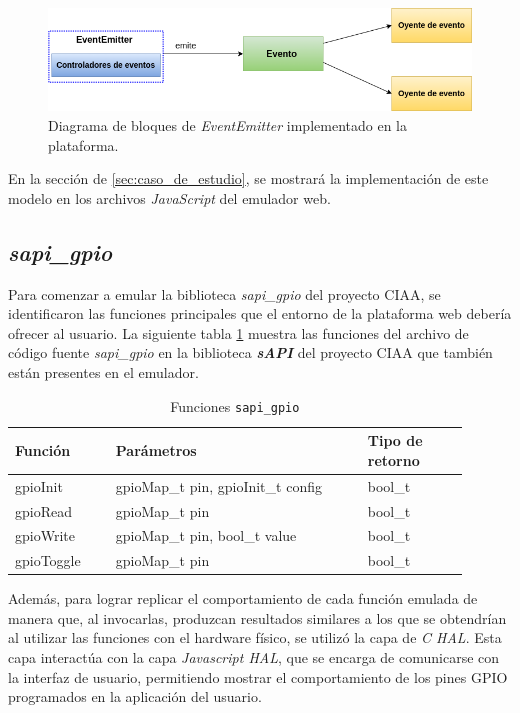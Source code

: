 \begin{figure}[ht]
	\centering
	\includegraphics[scale=.49]{./Figures/EventemitterNodejs.png}
	\caption{Diagrama de bloques de \textit{EventEmitter} implementado en la plataforma.}
	\label{fig:EventemitterNodejs}
\end{figure}

En la sección de \ref{sec:caso_de_estudio}, se mostrará la implementación de este modelo en los archivos \textit{JavaScript} del emulador web.

\subsection{\textit{\textbf{sapi\_gpio}}}

Para comenzar a emular la biblioteca \textit{sapi\_gpio} del proyecto CIAA, se identificaron las funciones principales que el entorno de la plataforma web debería ofrecer al usuario. La siguiente tabla \ref{tab:sapiGPIO} muestra las funciones del archivo de código fuente \textit{sapi\_gpio} en la biblioteca \textit{\textbf{sAPI}} del proyecto CIAA que también están presentes en el emulador.

\hfill \break

\begin{table}[h]
	\centering
	\caption[Funciones \texttt{sapi\_gpio}]{Funciones \texttt{sapi\_gpio}}
	\begin{tabular}{p{0.20\linewidth} p{0.50\linewidth}  p{0.20\linewidth}}    
		\toprule
		\textbf{Función} 	 & \textbf{Parámetros} 		& \textbf{Tipo de retorno}  \\
		\midrule
		gpioInit & gpioMap\_t pin, gpioInit\_t config 		&  bool\_t \\		
		gpioRead	 & gpioMap\_t pin			&  bool\_t \\
		gpioWrite	 & gpioMap\_t pin, bool\_t value			& bool\_t \\
		gpioToggle	 & gpioMap\_t pin				&  bool\_t \\
		\bottomrule
		\hline
	\end{tabular}
	\label{tab:sapiGPIO}
\end{table}

Además, para lograr replicar el comportamiento de cada función emulada de manera que, al invocarlas, produzcan resultados similares a los que se obtendrían al utilizar las funciones con el hardware físico, se utilizó la capa de \textit{C HAL}. Esta capa interactúa con la capa \textit{Javascript HAL}, que se encarga de comunicarse con la interfaz de usuario, permitiendo mostrar el comportamiento de los pines GPIO programados en la aplicación del usuario.

